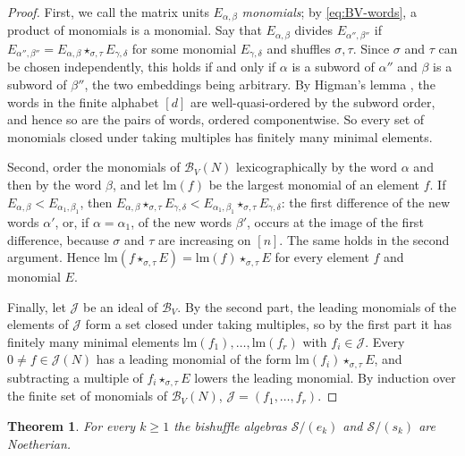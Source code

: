 \documentclass[11pt]{amsart}
\newtheorem{theorem}{Theorem}[section]
\theoremstyle{definition}
\theoremstyle{remark}
\newcommand{\lm}{\mathrm{lm}}
\newcommand{\cB}{\mathcal{B}}
\newcommand{\cJ}{\mathscr{J}}
\newcommand{\cS}{\mathscr{S}}
\begin{document}
\begin{proof}
First, we call the matrix units $E_{\alpha,\beta}$ \emph{monomials}; by \eqref{eq:BV-words}, a product of monomials is a monomial. Say that $E_{\alpha,\beta}$ divides $E_{\alpha'',\beta''}$ if $E_{\alpha'',\beta''}=E_{\alpha,\beta}\star_{\sigma,\tau}E_{\gamma,\delta}$ for some monomial $E_{\gamma,\delta}$ and shuffles $\sigma,\tau$. Since $\sigma$ and $\tau$ can be chosen independently, this holds if and only if $\alpha$ is a subword of $\alpha''$ and $\beta$ is a subword of $\beta''$, the two embeddings being arbitrary. By Higman's lemma \cite{Higman}, the words in the finite alphabet $[d]$ are well-quasi-ordered by the subword order, and hence so are the pairs of words, ordered componentwise. So every set of monomials closed under taking multiples has finitely many minimal elements.

Second, order the monomials of $\cB_V(N)$ lexicographically by the word $\alpha$ and then by the word $\beta$, and let $\lm(f)$ be the largest monomial of an element $f$. If $E_{\alpha,\beta}<E_{\alpha_1,\beta_1}$, then $E_{\alpha,\beta}\star_{\sigma,\tau}E_{\gamma,\delta}<E_{\alpha_1,\beta_1}\star_{\sigma,\tau}E_{\gamma,\delta}$: the first difference of the new words $\alpha'$, or, if $\alpha=\alpha_1$, of the new words $\beta'$, occurs at the image of the first difference, because $\sigma$ and $\tau$ are increasing on $[n]$. The same holds in the second argument. Hence $\lm(f\star_{\sigma,\tau}E)=\lm(f)\star_{\sigma,\tau}E$ for every element $f$ and monomial $E$.

Finally, let $\cJ$ be an ideal of $\cB_V$. By the second part, the leading monomials of the elements of $\cJ$ form a set closed under taking multiples, so by the first part it has finitely many minimal elements $\lm(f_1),\dots,\lm(f_r)$ with $f_i\in\cJ$. Every $0\ne f\in\cJ(N)$ has a leading monomial of the form $\lm(f_i)\star_{\sigma,\tau}E$, and subtracting a multiple of $f_i\star_{\sigma,\tau}E$ lowers the leading monomial. By induction over the finite set of monomials of $\cB_V(N)$, $\cJ=(f_1,\dots,f_r)$.
\end{proof}

\begin{theorem}\label{thm:noeth-ek}
For every $k\ge1$ the bishuffle algebras $\cS/(e_k)$ and $\cS/(s_k)$ are Noetherian.
\end{theorem}
\end{document}
